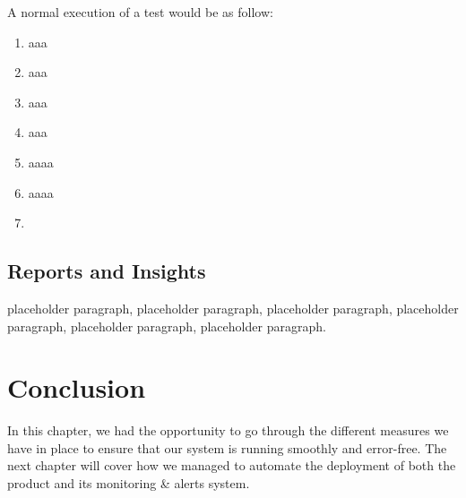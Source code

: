 A normal execution of a test would be as follow: 
\begin{enumerate}
\item aaa
\item aaa
\item aaa
\item aaa
\item aaaa
\item aaaa
\item 
\end{enumerate}

\subsection{Reports and Insights}

placeholder paragraph, placeholder paragraph, placeholder paragraph, placeholder paragraph, placeholder paragraph, placeholder paragraph.

\section*{Conclusion}
\qquad

In this chapter, we had the opportunity to go through the different measures we have in place to ensure that our system is running smoothly and error-free. The next chapter will cover how we managed to automate the deployment of both the product and its monitoring \& alerts system. 
